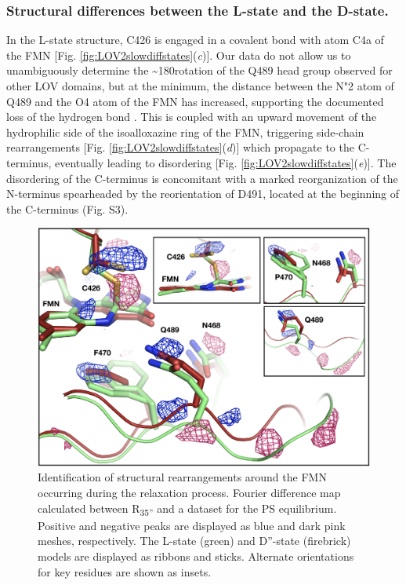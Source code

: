 \subsubsection{Structural differences between the L-state and the D-state.}
In the L-state structure, C426 is engaged in a covalent bond with atom C4a of the FMN [Fig. \ref{fig:LOV2slowdiffstates}(\textit{c})]. Our data do not allow us to unambiguously determine the \textasciitilde180\degree  rotation of the Q489 head group observed for other LOV domains, but at the minimum, the distance between the N"2 atom of Q489 and the O4 atom of the FMN has increased, supporting the documented loss of the hydrogen bond \parencite{iulianoUnravelingMechanismLOV2020}. This is coupled with an upward movement of the hydrophilic side of the isoalloxazine ring of the FMN, triggering side-chain rearrangements [Fig. \ref{fig:LOV2slowdiffstates}(\textit{d})] which propagate to the C-terminus, eventually leading to disordering [Fig. \ref{fig:LOV2slowdiffstates}(\textit{e})]. The disordering of the C-terminus is concomitant with a marked reorganization of the N-terminus spearheaded by the reorientation of D491, located at the beginning of the C-terminus (Fig. S3).

\begin{figure}[H] %
    \centering
    \noindent \includegraphics[width=\textwidth]{images/LOV2/LOV2slow_Fig4.pdf}
    \hfill
    \caption{Identification of structural rearrangements around the FMN occurring during the relaxation process. Fourier difference map calculated between R\textsubscript{35''} and a dataset for the PS equilibrium. Positive and negative peaks are displayed as blue and dark pink meshes, respectively. The L-state (green) and D''-state (firebrick) models are displayed as ribbons and sticks. Alternate orientations for key residues are shown as insets.}
    \label{fig:LOV2slowQ489mech}
\end{figure}

